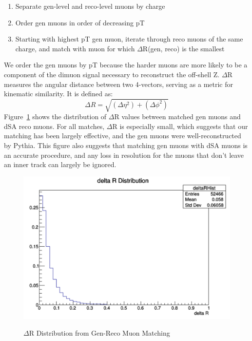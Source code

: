 \documentclass{article}
\begin{document}
\begin{enumerate}
    \item Separate gen-level and reco-level muons by charge
    \item Order gen muons in order of decreasing pT
    \item Starting with highest pT gen muon, iterate through reco muons of the same charge, and match with muon for which $\Delta$R(gen, reco) is the smallest
\end{enumerate}
\par
We order the gen muons by pT because the harder muons are more likely to be a component of the dimuon signal necessary to reconstruct the off-shell Z. $\Delta$R measures the angular distance between two 4-vectors, serving as a metric for kinematic similarity. It is defined as:
\[\Delta R = \sqrt{(\Delta\eta^{2})+(\Delta\phi^{2})}\]
Figure~\ref{fig:11} shows the distribution of $\Delta$R values between matched gen muons and dSA reco muons. For all matches, $\Delta$R is especially small, which suggests that our matching has been largely effective, and the gen muons were well-reconstructed by Pythia. This figure also suggests that matching gen muons with dSA muons is an accurate procedure, and any loss in resolution for the muons that don't leave an inner track can largely be ignored.
\begin{figure}[H]
    \centering
    \caption{$\Delta$R Distribution from Gen-Reco Muon Matching} 
    \includegraphics[width=12cm]{deltaR.png}
    \label{fig:11}
\end{figure}
\par
\end{document}
